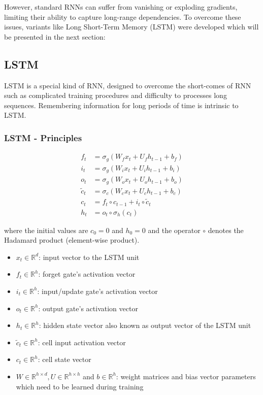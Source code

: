 \documentclass[12pt]{report}
\begin{document}
However, standard RNNs can suffer from vanishing or exploding gradients, limiting their ability to capture long-range dependencies. To overcome these issues, variants like Long Short-Term Memory (LSTM) were developed which will be presented in the next section:

\newpage

\subsection{LSTM }

LSTM is a special kind of RNN, designed to overcome the short-comes of RNN such as complicated training procedures and  difficulty to processes long sequences. Remembering information for long periods of time is intrinsic to LSTM.


\subsubsection{LSTM - Principles}
\begin{align*}
	f_t &= \sigma_g(W_{f} x_t + U_{f} h_{t-1} + b_f) \\
	i_t &= \sigma_g(W_{i} x_t + U_{i} h_{t-1} + b_i) \\
	o_t &= \sigma_g(W_{o} x_t + U_{o} h_{t-1} + b_o) \\
	\tilde{c}_t &= \sigma_c(W_{c} x_t + U_{c} h_{t-1} + b_c) \\
	c_t &= f_t \circ c_{t-1} + i_t \circ \tilde{c}_t \\
	h_t &= o_t \circ \sigma_h(c_t)
\end{align*}

where the initial values are $c_0 = 0$ and $h_0 = 0$ and the operator $\circ$ denotes the Hadamard product (element-wise product). 

\begin{itemize}
	\item $x_t \in \mathbb{R}^{d}$: input vector to the LSTM unit 
	\item $f_t \in \mathbb{R}^{h}$: forget gate's activation vector
	\item $i_t \in \mathbb{R}^{h}$: input/update gate's activation vector 
	\item $o_t \in \mathbb{R}^{h}$: output gate's activation vector
	\item $h_t \in \mathbb{R}^{h}$: hidden state vector also known as output vector of the LSTM unit 
	\item $\tilde{c}_t \in \mathbb{R}^{h}$: cell input activation vector
	\item $c_t \in \mathbb{R}^{h}$: cell state vector
	\item $W \in \mathbb{R}^{h \times d}, U \in \mathbb{R}^{h \times h} $ and $b \in \mathbb{R}^{h}$: weight matrices and bias vector parameters which need to be learned during training
\end{itemize}
\end{document}
